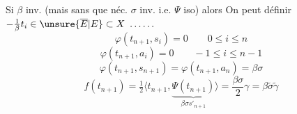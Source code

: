 Si \(\beta\) inv. (mais sans que néc. \(\sigma\) inv. i.e. \(\Psi\) iso) alors
On peut définir \(-\frac1\beta t_i\in\unsure{\overline E|E}\subset X\ \ldots\ldots\)
\[
\varphi(t_{n+1},s_i)=0\qquad0\leq i\leq n
\]
\[
\varphi(t_{n+1},a_i)=0\qquad-1\leq i\leq n-1
\]
\[
\varphi(t_{n+1},s_{n+1})=\varphi(t_{n+1},a_n)=\beta\sigma
\]
\[
f(t_{n+1})=\tfrac12\langle t_{n+1},
\underbrace{\Psi(t_{n+1})}_{\beta\sigma s'_{n+1}}\rangle
=\frac{\beta\sigma}{2}\gamma=\beta\widetilde\sigma\widetilde\gamma
\]

